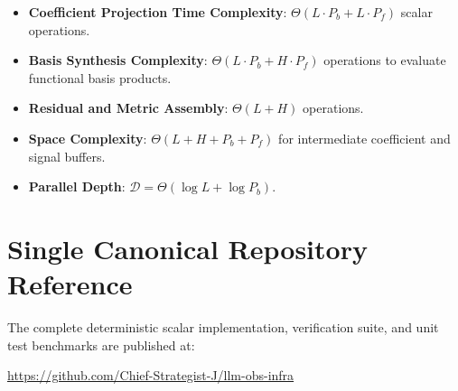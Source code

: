 \documentclass[11pt,a4paper]{article}
\theoremstyle{definition}
\begin{document}
\begin{itemize}
    \item \textbf{Coefficient Projection Time Complexity}: $\Theta(L \cdot P_b + L \cdot P_f)$ scalar operations.
    \item \textbf{Basis Synthesis Complexity}: $\Theta(L \cdot P_b + H \cdot P_f)$ operations to evaluate functional basis products.
    \item \textbf{Residual and Metric Assembly}: $\Theta(L + H)$ operations.
    \item \textbf{Space Complexity}: $\Theta(L + H + P_b + P_f)$ for intermediate coefficient and signal buffers.
    \item \textbf{Parallel Depth}: $\mathcal{D} = \Theta(\log L + \log P_b)$.
\end{itemize}

\section{Single Canonical Repository Reference}

The complete deterministic scalar implementation, verification suite, and unit test benchmarks are published at:
\begin{center}
\url{https://github.com/Chief-Strategist-J/llm-obs-infra}
\end{center}
\end{document}
